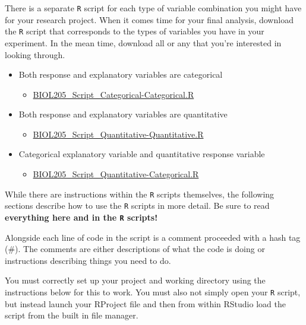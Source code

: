 \documentclass[
]{book}
\providecommand{\tightlist}{%
  \setlength{\itemsep}{0pt}\setlength{\parskip}{0pt}}
\begin{document}
There is a separate \texttt{R} script for each type of variable combination you might have for your research project. When it comes time for your final analysis, download the \texttt{R} script that corresponds to the types of variables you have in your experiment. In the mean time, download all or any that you're interested in looking through.

\begin{itemize}
\tightlist
\item
  Both response and explanatory variables are categorical

  \begin{itemize}
  \tightlist
  \item
    \href{https://osf.io/download/sg7y6}{BIOL205\_Script\_Categorical-Categorical.R}
  \end{itemize}
\item
  Both response and explanatory variables are quantitative

  \begin{itemize}
  \tightlist
  \item
    \href{https://osf.io/download/adwg4}{BIOL205\_Script\_Quantitative-Quantitative.R}
  \end{itemize}
\item
  Categorical explanatory variable and quantitative response variable

  \begin{itemize}
  \tightlist
  \item
    \href{https://osf.io/download/2hsk5}{BIOL205\_Script\_Quantitative-Categorical.R}
  \end{itemize}
\end{itemize}

While there are instructions within the \texttt{R} scripts themselves, the following sections describe how to use the \texttt{R} scripts in more detail. Be sure to read \textbf{everything here and in the \texttt{R} scripts!}

Alongside each line of code in the script is a comment proceeded with a hash tag (\#). The comments are either descriptions of what the code is doing or instructions describing things you need to do.

You must correctly set up your project and working directory using the instructions below for this to work. You must also not simply open your \texttt{R} script, but instead launch your RProject file and then from within RStudio load the script from the built in file manager.
\end{document}

